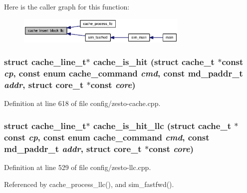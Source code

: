 Here is the caller graph for this function:\nopagebreak
\begin{figure}[H]
\begin{center}
\leavevmode
\includegraphics[width=231pt]{config_2zesto-cache_8h_abc5a15d6fe00d533a2b4b8e4b13cc59_icgraph}
\end{center}
\end{figure}
\subsubsection[{cache\_\-is\_\-hit}]{\setlength{\rightskip}{0pt plus 5cm}struct {\bf cache\_\-line\_\-t}$\ast$ cache\_\-is\_\-hit (struct {\bf cache\_\-t} $\ast$const  {\em cp}, \/  const enum {\bf cache\_\-command} {\em cmd}, \/  const {\bf md\_\-paddr\_\-t} {\em addr}, \/  struct {\bf core\_\-t} $\ast$const  {\em core})\hspace{0.3cm}{\tt  [read]}}\label{config_2zesto-cache_8h_bbba2e5ba6186173122bcf1e35dc56eb}




Definition at line 618 of file config/zesto-cache.cpp.
\subsubsection[{cache\_\-is\_\-hit\_\-llc}]{\setlength{\rightskip}{0pt plus 5cm}struct {\bf cache\_\-line\_\-t}$\ast$ cache\_\-is\_\-hit\_\-llc (struct {\bf cache\_\-t} $\ast$const  {\em cp}, \/  const enum {\bf cache\_\-command} {\em cmd}, \/  const {\bf md\_\-paddr\_\-t} {\em addr}, \/  struct {\bf core\_\-t} $\ast$const  {\em core})\hspace{0.3cm}{\tt  [read]}}\label{config_2zesto-cache_8h_4c8a74cb2e996679500e5a9adb9efb5c}




Definition at line 529 of file config/zesto-llc.cpp.

Referenced by cache\_\-process\_\-llc(), and sim\_\-fastfwd().

